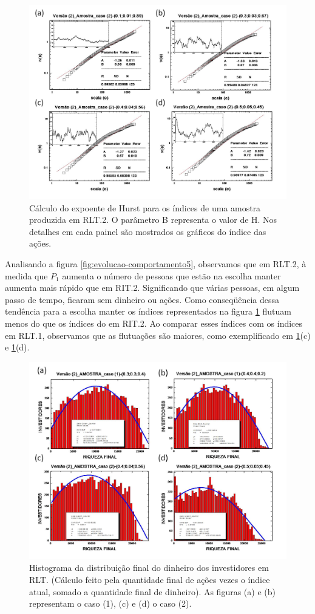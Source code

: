 \documentclass[brazil,ruledheader]{abnt}
\begin{document}
\begin{figure}[!h]
\centering
\includegraphics[width=0.8\linewidth]{Figuras/15.jpg}
\caption[ Cálculo do expoente de Hurst para os índices em RLT.2] {Cálculo do
expoente de Hurst para os índices de uma amostra produzida em RLT.2.  O
parâmetro B representa o valor de H. Nos detalhes em cada painel são mostrados
os gráficos do índice
das ações.  }
\label{fig:calculo-expoente-hurst6}
\end{figure}

Analisando a figura \ref{fig:evolucao-comportamento5}, observamos que em RLT.2,
à medida que $P_1$ aumenta o número de pessoas que estão na escolha manter
aumenta mais rápido que em RIT.2. Significando que várias pessoas, em algum
passo de tempo, ficaram sem dinheiro ou ações. Como conseqüência dessa tendência
para a escolha manter os índices representados na figura
\ref{fig:calculo-expoente-hurst6} flutuam menos do que os índices do em RIT.2. 
Ao comparar esses índices com os índices em RLT.1, observamos que as flutuações
são maiores, como exemplificado em \ref{fig:calculo-expoente-hurst6}(c) e
\ref{fig:calculo-expoente-hurst6}(d). 



\begin{figure}[!h]
\centering
\includegraphics[width=0.8\linewidth]{Figuras/16.jpg}
\caption [Histograma da distribuição final do dinheiro dos investidores em
RLT]{Histograma da distribuição final do dinheiro dos investidores em RLT.
(Cálculo feito pela
quantidade final de ações vezes o índice atual, somado a quantidade final de
dinheiro). As figuras (a) e (b) representam o caso (1), (c) e (d) o caso (2).}
\label{fig:histograma}
\end{figure}
\end{document}
